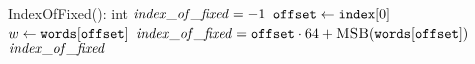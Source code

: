 \PROCEDURE IndexOfFixed(): int
\STATE $\mathit{index\_of\_fixed} = -1$
  \STATE $\texttt{offset} \leftarrow \texttt{index}[0]$
  \STATE $w \leftarrow \texttt{words}[\texttt{offset}]$
    \STATE $\mathit{index\_of\_fixed} = \texttt{offset} \cdot 64 + \textsc{MSB}(\texttt{words}[\texttt{offset}])$
  \ENDIF
\ENDIF
\RETURN $\mathit{index\_of\_fixed}$
